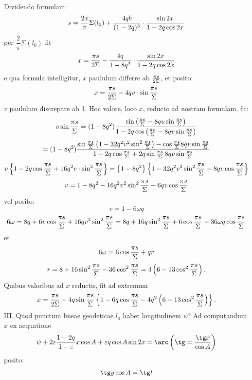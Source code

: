 \begingroup\small
Dividendo formulam:
\[
 s={2x\over\pi}\Sigma(l_0)+{4qb\over(1-2q)^3}\cdot{\sin2x\over1-2q\cos2x}
\]
per $\dfrac{2}{\pi}\Sigma(l_0)$ fit
\[
 x={\pi s\over2\Sigma}-{4q\over1+8q^2}\cdot{\sin2x\over1-2q\cos2x}
\]
e qua formula intelligitur, $x$ paululum differre ab ${\pi s\over2\Sigma}$, et posito:
\[
 x={\pi s\over2\Sigma}-4qv\cdot\sin{\pi s\over\Sigma}
\]
$v$ paululum discrepare ab 1.
Hoc valore, loco $x$, reducto ad nostram formulam, fit:
\[
 v\sin{\pi s\over\Sigma}
=(1-8q^2){\sin\left({\pi s\over\Sigma}-8qv\sin{\pi s\over\Sigma}\right)
\over
1-2q\cos\left({\pi s\over\Sigma}-8qv\sin{\pi s\over\Sigma}\right)}
\]
\[
=(1-8q^2){\sin{\pi s\over\Sigma}\left(1-32q^2v^2\sin^2{\pi s\over\Sigma}\right)-\cos{\pi s\over\Sigma}8qv\sin{\pi s\over\Sigma}
\over
1-2q\cos{\pi s\over\Sigma}+2q\sin{\pi s\over\Sigma}\,8qv\sin{\pi s\over\Sigma}}
\]
\[
 v\left\{1-2q\cos{\pi s\over\Sigma}+16q^2v\cdot\sin^2{\pi s\over\Sigma}\right\}
=\left\{1-8q^2\right\}\left\{1-32q^2v^2\sin^2{\pi s\over\Sigma}-8qv\cos{\pi s\over\Sigma}\right\}
\]
\[
 v=1-8q^2-16q^2v^2\sin^2{\pi s\over\Sigma}-6qv\cos{\pi s\over\Sigma}
\]
vel posito:
\[
 v=1-6\omega q
\]
\[
 6\omega=8q+6v\cos{\pi s\over\Sigma}+16qv^2\sin^2{\pi s\over\Sigma}
=8q+16q\sin^2{\pi s\over\Sigma}+6\cos{\pi s\over\Sigma}-36\omega q\cos{\pi s\over\Sigma}
\]
et
\[
 6\omega=6\cos{\pi s\over\Sigma}+q r
\]
\[
 r=8+16\sin^2{\pi s\over\Sigma}-36\cos^2{\pi s\over\Sigma}=4\left(6-13\cos^2{\pi s\over\Sigma}\right).
\]
Quibus valoribus ad $x$ reductis, fit ad extremum
\[
 x={\pi s\over2\Sigma}-4q\sin{\pi s\over\Sigma}\left\{1-6q\cos{\pi s\over\Sigma}-4q^2\left(6-13\cos^2{\pi s\over\Sigma}\right)\right\}.
\]
III. Quod punctum lineae geodeticae $l_0$ habet longitudinem $\psi$?
Ad computandum $x$ ex aequatione
\[
 \psi+2\varepsilon{1-2q\over1-\varepsilon}x\cos A+\varepsilon q\cos A\sin2x
 =\arc\left(\tg={\tg x\over\cos A}\right)
\]
posito:
\[
 \tg y\cos A=\tg t
\]
\endgroup

